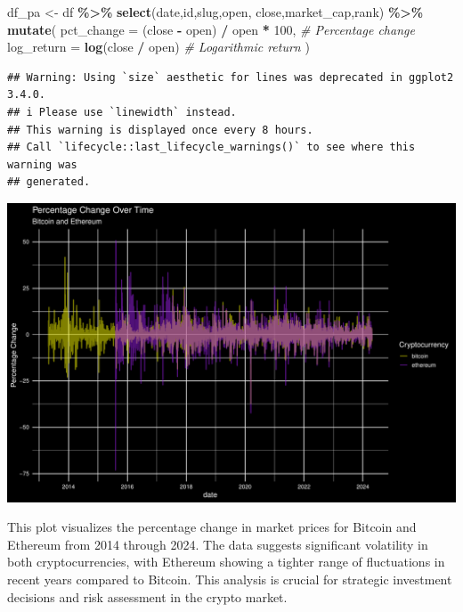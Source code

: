 \documentclass[
]{article}
\newenvironment{Shaded}{\begin{snugshade}}{\end{snugshade}}
\newcommand{\AttributeTok}[1]{\textcolor[rgb]{0.13,0.29,0.53}{#1}}
\newcommand{\CommentTok}[1]{\textcolor[rgb]{0.56,0.35,0.01}{\textit{#1}}}
\newcommand{\DecValTok}[1]{\textcolor[rgb]{0.00,0.00,0.81}{#1}}
\newcommand{\FunctionTok}[1]{\textcolor[rgb]{0.13,0.29,0.53}{\textbf{#1}}}
\newcommand{\NormalTok}[1]{#1}
\newcommand{\OtherTok}[1]{\textcolor[rgb]{0.56,0.35,0.01}{#1}}
\newcommand{\SpecialCharTok}[1]{\textcolor[rgb]{0.81,0.36,0.00}{\textbf{#1}}}
\begin{document}
\begin{Shaded}
\begin{Highlighting}[]
\NormalTok{df\_pa }\OtherTok{\textless{}{-}}\NormalTok{ df }\SpecialCharTok{\%\textgreater{}\%}
  \FunctionTok{select}\NormalTok{(date,id,slug,open, close,market\_cap,rank) }\SpecialCharTok{\%\textgreater{}\%}
  \FunctionTok{mutate}\NormalTok{(}
    \AttributeTok{pct\_change =}\NormalTok{ (close }\SpecialCharTok{{-}}\NormalTok{ open) }\SpecialCharTok{/}\NormalTok{ open }\SpecialCharTok{*} \DecValTok{100}\NormalTok{, }\CommentTok{\# Percentage change}
    \AttributeTok{log\_return =} \FunctionTok{log}\NormalTok{(close }\SpecialCharTok{/}\NormalTok{ open) }\CommentTok{\# Logarithmic return}
\NormalTok{  )}
\end{Highlighting}
\end{Shaded}

\begin{verbatim}
## Warning: Using `size` aesthetic for lines was deprecated in ggplot2 3.4.0.
## i Please use `linewidth` instead.
## This warning is displayed once every 8 hours.
## Call `lifecycle::last_lifecycle_warnings()` to see where this warning was
## generated.
\end{verbatim}

\includegraphics{Crypto_ETL_files/figure-latex/Plot mom qoq 13151-1.pdf}

This plot visualizes the percentage change in market prices for Bitcoin
and Ethereum from 2014 through 2024. The data suggests significant
volatility in both cryptocurrencies, with Ethereum showing a tighter
range of fluctuations in recent years compared to Bitcoin. This analysis
is crucial for strategic investment decisions and risk assessment in the
crypto market.
\end{document}
